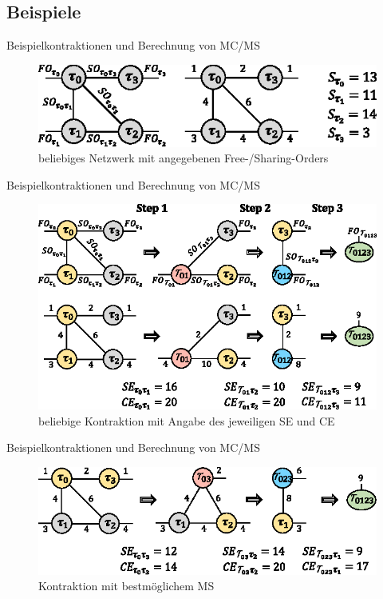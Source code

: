 \documentclass{beamer}
\begin{document}
\subsection{Beispiele}

\begin{frame}{Beispielkontraktionen und Berechnung von MC/MS}
	\begin{figure}
		\includegraphics{figure_03_a}
		\caption*{beliebiges Netzwerk mit angegebenen Free-/Sharing-Orders}
	\end{figure}
\end{frame}

\begin{frame}{Beispielkontraktionen und Berechnung von MC/MS}
	\begin{figure}
		\includegraphics{figure_03_b}
		\caption*{beliebige Kontraktion mit Angabe des jeweiligen SE und CE}
	\end{figure}
\end{frame}

\begin{frame}{Beispielkontraktionen und Berechnung von MC/MS}
	\begin{figure}
		\includegraphics{figure_03_c}
		\caption*{Kontraktion mit bestmöglichem MS}
	\end{figure}
\end{frame}
\end{document}
